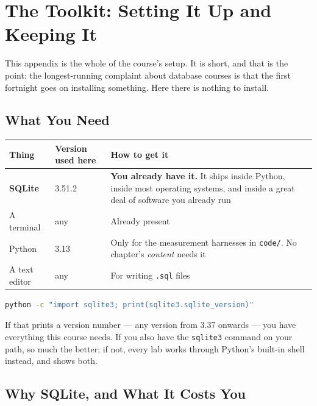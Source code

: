 \chapter{The Toolkit: Setting It Up and Keeping It}\label{app:toolkit}
\normalfigures

This appendix is the whole of the course's setup. It is short, and that is the
point: the longest-running complaint about database courses is that the first
fortnight goes on installing something. Here there is nothing to install.

\section{What You Need}

\begin{longtable}{@{}L{3.4cm}L{4.2cm}L{6.8cm}@{}}
\toprule
{}
\textbf{Thing} & \textbf{Version used here} & \textbf{How to get it} \\
\midrule
\endhead
\textbf{SQLite} & 3.51.2 & \textbf{You already have it.} It ships inside
Python, inside most operating systems, and inside a great deal of software you
already run \\
A terminal & any & Already present \\
Python & 3.13 & Only for the measurement harnesses in \texttt{code/}. No
chapter's \emph{content} needs it \\
A text editor & any & For writing \texttt{.sql} files \\
\bottomrule
\end{longtable}

\begin{conceptbox}
\begin{lstlisting}[language=bash]
python -c "import sqlite3; print(sqlite3.sqlite_version)"
\end{lstlisting}

If that prints a version number --- any version from 3.37 onwards --- you have
everything this course needs. If you also have the \texttt{sqlite3} command on
your path, so much the better; if not, every lab works through Python's
built-in shell instead, and  shows both.
\end{conceptbox}

\section{Why SQLite, and What It Costs You}

